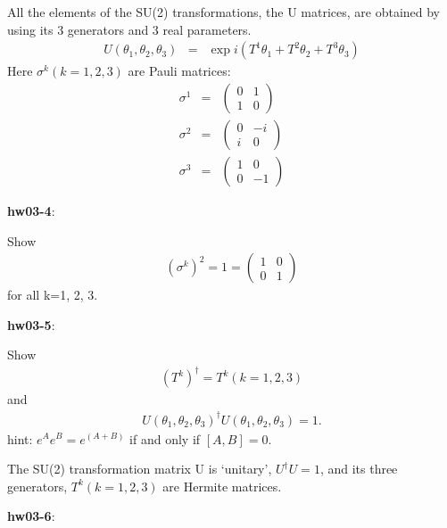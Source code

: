 \documentclass[12pt]{article}
\begin{document}
  All the elements of the SU(2) transformations, the U matrices,
  are obtained by using its 3 generators and 3 real parameters.
  \begin{eqnarray}
  U(\theta_1, \theta_2, \theta_3)  &=&\exp{ i (T^1 \theta_1 + T^2 \theta_2 + T^3 \theta_3) }
  \end{eqnarray}
  Here $\sigma^k (k=1,2,3)$ are Pauli matrices:
  \begin{eqnarray}
  \sigma^1 &=& 
  \begin{pmatrix}
    0 & 1 \\
    1 & 0
  \end{pmatrix}\\
  \sigma^2 &=&
  \begin{pmatrix}
    0 & -i \\
    i & 0
  \end{pmatrix}\\ 
  \sigma^3 &=&
  \begin{pmatrix}
    1 & 0 \\
    0&-1
  \end{pmatrix}
  \end{eqnarray}


{\bf hw03-4}:

  Show 
  \begin{eqnarray}
    (\sigma^k)^2=1=
    \begin{pmatrix}
      1 & 0\\
      0 & 1
    \end{pmatrix}
  \end{eqnarray}
  for all k=1, 2, 3.

{\bf hw03-5}:

  Show
  \begin{eqnarray}
    (T^k)^\dagger = T^k   (k = 1,2,3)
  \end{eqnarray}
  and
  \begin{eqnarray}
  U(\theta_1, \theta_2, \theta_3)^\dagger U(\theta_1, \theta_2, \theta_3)
  = 1.
  \end{eqnarray}
hint: $e^A e^B = e^(A+B)$ if and only if $[A,B] = 0$.

  The SU(2) transformation matrix U is `unitary', $U^\dagger U = 1$,
  and its three generators, $T^k (k = 1,2,3)$ are Hermite matrices.

{\bf hw03-6}:
\end{document}
